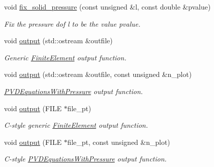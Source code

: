 \begin{DoxyCompactItemize}
void \hyperlink{classoomph_1_1QPVDElementWithContinuousPressure_ac86b448b58ca42cab0561cce11bdbd7d}{fix\+\_\+solid\+\_\+pressure} (const unsigned \&l, const double \&pvalue)
\begin{DoxyCompactList}\small\item\em Fix the pressure dof l to be the value pvalue. \end{DoxyCompactList}\item 
void \hyperlink{classoomph_1_1QPVDElementWithContinuousPressure_acc858925ae5724c02fc1073130f67430}{output} (std\+::ostream \&outfile)
\begin{DoxyCompactList}\small\item\em Generic \hyperlink{classoomph_1_1FiniteElement}{Finite\+Element} output function. \end{DoxyCompactList}\item 
void \hyperlink{classoomph_1_1QPVDElementWithContinuousPressure_a52659b143c819c1fcc86a6473ef324f0}{output} (std\+::ostream \&outfile, const unsigned \&n\+\_\+plot)
\begin{DoxyCompactList}\small\item\em \hyperlink{classoomph_1_1PVDEquationsWithPressure}{P\+V\+D\+Equations\+With\+Pressure} output function. \end{DoxyCompactList}\item 
void \hyperlink{classoomph_1_1QPVDElementWithContinuousPressure_ae44d9dd8f7a28dafd17e20a0408f4708}{output} (F\+I\+LE $\ast$file\+\_\+pt)
\begin{DoxyCompactList}\small\item\em C-\/style generic \hyperlink{classoomph_1_1FiniteElement}{Finite\+Element} output function. \end{DoxyCompactList}\item 
void \hyperlink{classoomph_1_1QPVDElementWithContinuousPressure_af9d764cc0daeb7151b37284bf2082162}{output} (F\+I\+LE $\ast$file\+\_\+pt, const unsigned \&n\+\_\+plot)
\begin{DoxyCompactList}\small\item\em C-\/style \hyperlink{classoomph_1_1PVDEquationsWithPressure}{P\+V\+D\+Equations\+With\+Pressure} output function. \end{DoxyCompactList}\end{DoxyCompactItemize}
